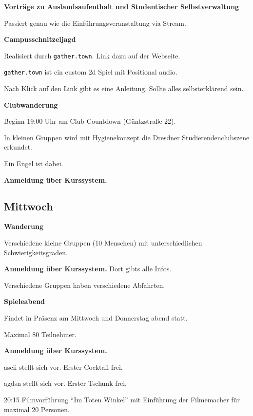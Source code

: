 \documentclass[a4paper,12pt]{scrreprt}
\begin{document}
\textbf{Vorträge zu Auslandsaufenthalt und Studentischer Selbstverwaltung}
\begin{itemize*}
    \item Passiert genau wie die Einführungsveranstaltung via Stream.
\end{itemize*}

\textbf{Campusschnitzeljagd}
\begin{itemize*}
    \item Realisiert durch \texttt{gather.town}. Link dazu auf der Webseite.
    \item \texttt{gather.town} ist ein custom 2d Spiel mit Positional audio.
    \item Nach Klick auf den Link gibt es eine Anleitung. Sollte alles selbsterklärend sein.
\end{itemize*}

\textbf{Clubwanderung}
\begin{itemize*}
    \item Beginn 19:00 Uhr am Club Countdown (Güntzstraße 22).
    \item In kleinen Gruppen wird mit Hygienekonzept die Dresdner Studierendenclubszene erkundet.
    \item Ein Engel ist dabei.
    \item \textbf{Anmeldung über Kurssystem.}
\end{itemize*}


\subsection{Mittwoch}

\textbf{Wanderung}
\begin{itemize*}
    \item Verschiedene kleine Gruppen (10 Menschen) mit unterschiedlichen Schwierigkeitsgraden.
    \item \textbf{Anmeldung über Kurssystem.} Dort gibts alle Infos.
    \item Verschiedene Gruppen haben verschiedene Abfahrten.
\end{itemize*}


\textbf{Spieleabend}
\begin{itemize*}
    \item Findet in Präsenz am Mittwoch und Donnerstag abend statt.
    \item Maximal 80 Teilnehmer.
    \item \textbf{Anmeldung über Kurssystem.}
    \item ascii stellt sich vor. Erster Cocktail frei.
    \item agdsn stellt sich vor. Erster Tschunk frei.
    \item 20:15 Filmvorführung \enquote{Im Toten Winkel} mit Einführung der Filmemacher für maximal 20 Personen.
\end{itemize*}
\end{document}
